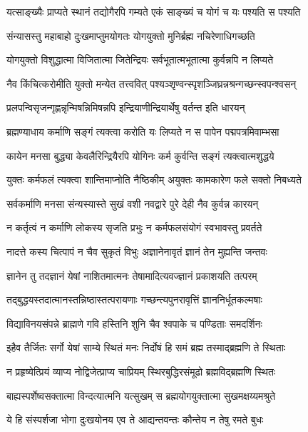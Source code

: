 \twolineshloka
{यत्साङ्ख्यैः प्राप्यते स्थानं तद्योगैरपि गम्यते}
{एकं साङ्ख्यं च योगं च यः पश्यति स पश्यति}


\twolineshloka
{संन्यासस्तु महाबाहो दुःखमाप्तुमयोगतः}
{योगयुक्तो मुनिर्ब्रह्म नचिरेणाधिगच्छति}


\twolineshloka
{योगयुक्तो विशुद्धात्मा विजितात्मा जितेन्द्रियः}
{सर्वभूतात्मभूतात्मा कुर्वन्नपि न लिप्यते}


\twolineshloka
{नैव किंचित्करोमीति युक्तो मन्येत तत्त्ववित्}
{पश्यञ्शृण्वन्स्पृशञ्जिघ्रन्नश्रन्गच्छन्स्वपन्श्वसन्}


\twolineshloka
{प्रलपन्विसृजन्गृह्णन्नृन्मिषन्निमिषन्नपि}
{इन्द्रियाणीन्द्रियार्थेषु वर्तन्त इति धारयन्}


\twolineshloka
{ब्रह्मण्याधाय कर्माणि सङ्गं त्यक्त्वा करोति यः}
{लिप्यते न स पापेन पद्मपत्रमिवाम्भसा}


\twolineshloka
{कायेन मनसा बुद्ध्या केवलैरिन्द्रियैरपि}
{योगिनः कर्म कुर्वन्ति सङ्गं त्यक्त्वात्मशुद्धये}


\twolineshloka
{युक्तः कर्मफलं त्यक्त्वा शान्तिमाप्नोति नैष्ठिकीम्}
{अयुक्तः कामकारेण फले सक्तो निबध्यते}


\twolineshloka
{सर्वकर्माणि मनसा संन्यस्यास्ते सुखं वशी}
{नवद्वारे पुरे देही नैव कुर्वन्न कारयन्}


\twolineshloka
{न कर्तृत्वं न कर्माणि लोकस्य सृजति प्रभुः}
{न कर्मफलसंयोगं स्वभावस्तु प्रवर्तते}


\twolineshloka
{नादत्ते कस्य चित्पापं न चैव सुकृतं विभुः}
{अज्ञानेनावृतं ज्ञानं तेन मुह्यन्ति जन्तवः}


\twolineshloka
{ज्ञानेन तु तदज्ञानं येषां नाशितमात्मनः}
{तेषामादित्यवज्ज्ञानं प्रकाशयति तत्परम्}


\twolineshloka
{तद्बुद्धयस्तदात्मानस्तन्निष्ठास्तत्परायणाः}
{गच्छन्त्यपुनरावृत्तिं ज्ञाननिर्धूतकल्मषाः}


\twolineshloka
{विद्याविनयसंपन्ने ब्राह्मणे गवि हस्तिनि}
{शुनि चैव श्वपाके च पण्डिताः समदर्शिनः}


\twolineshloka
{इहैव तैर्जितः सर्गो येषां साम्ये स्थितं मनः}
{निर्दोषं हि समं ब्रह्म तस्माद्ब्रह्मणि ते स्थिताः}


\twolineshloka
{न प्रहृष्येत्प्रियं व्याप्य नोद्विजेत्प्राप्य चाप्रियम्}
{स्थिरबुद्धिरसंमूढो ब्रह्मविद्ब्रह्मणि स्थितः}


\twolineshloka
{बाह्यस्पर्शेष्वसक्तात्मा विन्दत्यात्मनि यत्सुखम्}
{स ब्रह्मयोगयुक्तात्मा सुखमक्षय्यमश्रुते}


\twolineshloka
{ये हि संस्पर्शजा भोगा दुःखयोनय एव ते}
{आद्यन्तवन्तः कौन्तेय न तेषु रमते बुधः}


